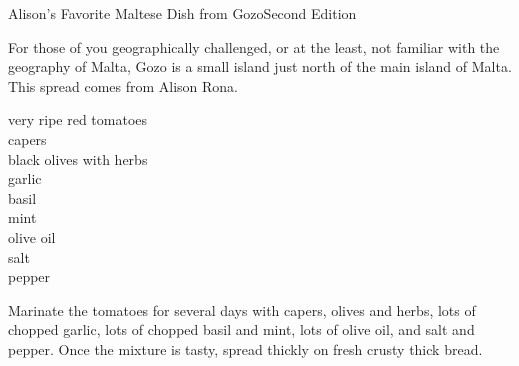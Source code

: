 \begin{entry}{Alison's Favorite Maltese Dish from Gozo}{Second Edition}

\begin{open}
  For those of you geographically challenged, or at the least, not familiar
  with the geography of Malta, Gozo is a small island just north of the main
  island of Malta.  This spread comes from Alison Rona.
\end{open}
\begin{ingredients}
    very ripe red tomatoes\\
    capers\\
    black olives with herbs\\
    garlic\\
    basil\\
    mint\\
    olive oil\\
    salt\\
    pepper
\end{ingredients}
Marinate the tomatoes for several days with capers, olives and herbs, lots of
chopped garlic, lots of chopped basil and mint, lots of olive oil, and salt
and pepper.  Once the mixture is tasty, spread thickly on fresh crusty thick
bread.
\end{entry}

